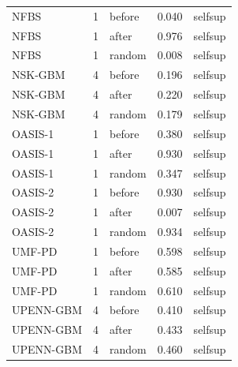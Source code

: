 \begin{tabular}{lrlrl}
NFBS & 1 & before & 0.040 & selfsup \\
NFBS & 1 & after & 0.976 & selfsup \\
NFBS & 1 & random & 0.008 & selfsup \\
NSK-GBM & 4 & before & 0.196 & selfsup \\
NSK-GBM & 4 & after & 0.220 & selfsup \\
NSK-GBM & 4 & random & 0.179 & selfsup \\
OASIS-1 & 1 & before & 0.380 & selfsup \\
OASIS-1 & 1 & after & 0.930 & selfsup \\
OASIS-1 & 1 & random & 0.347 & selfsup \\
OASIS-2 & 1 & before & 0.930 & selfsup \\
OASIS-2 & 1 & after & 0.007 & selfsup \\
OASIS-2 & 1 & random & 0.934 & selfsup \\
UMF-PD & 1 & before & 0.598 & selfsup \\
UMF-PD & 1 & after & 0.585 & selfsup \\
UMF-PD & 1 & random & 0.610 & selfsup \\
UPENN-GBM & 4 & before & 0.410 & selfsup \\
UPENN-GBM & 4 & after & 0.433 & selfsup \\
UPENN-GBM & 4 & random & 0.460 & selfsup \\
\bottomrule
\end{tabular}
